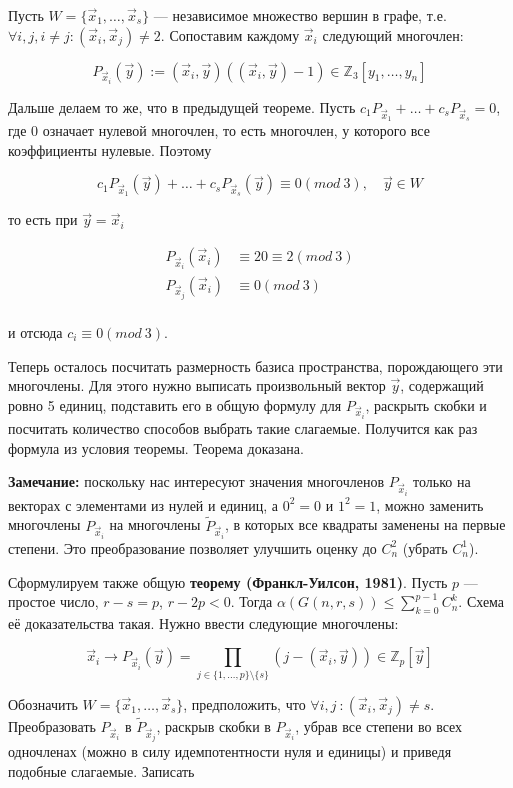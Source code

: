 \documentclass[12pt]{article}
\begin{document}
Пусть $W = \{ \vec x_1 , \ldots, \vec x_s \}$ — независимое множество вершин в графе, т.е. $\forall i, j, i \neq j \colon (\vec x_i, \vec x_j) \neq 2$. Сопоставим каждому $\vec x_i$ следующий многочлен:

\[
P_{\vec x_i}(\vec y) := (\vec x_i, \vec y) ((\vec x_i, \vec y) - 1) \in \mathbb{Z}_3 [y_1, \ldots, y_n]
\]

Дальше делаем то же, что в предыдущей теореме. Пусть $c_1 P_{\vec x_1} + \ldots + c_s P_{\vec x_s} = 0$, где $0$ означает нулевой многочлен, то есть многочлен, у которого все коэффициенты нулевые. Поэтому

\[
c_1 P_{\vec x_1}(\vec y) + \ldots + c_s P_{\vec x_s}(\vec y) \equiv 0 (mod\ 3), \quad \vec y \in W
\]

то есть при $\vec y = \vec x_i$

\begin{align*}
P_{\vec x_i}(\vec x_i) &\equiv 20 \equiv 2 (mod\ 3) \\
P_{\vec x_j}(\vec x_i) &\equiv 0 (mod\ 3) \\
\end{align*}

и отсюда $c_i \equiv 0 (mod\ 3)$.

Теперь осталось посчитать размерность базиса пространства, порождающего эти многочлены. Для этого нужно выписать произвольный вектор $\vec y$, содержащий ровно 5 единиц, подставить его в общую формулу для $P_{\vec x_i}$, раскрыть скобки и посчитать количество способов выбрать такие слагаемые. Получится как раз формула из условия теоремы. Теорема доказана.

\textbf{Замечание:} поскольку нас интересуют значения многочленов $P_{\vec x_i}$ только на векторах с элементами из нулей и единиц, а $0^2 = 0$ и $1^2 = 1$, можно заменить многочлены $P_{\vec x_i}$ на многочлены $\tilde{P}_{\vec x_i}$, в которых все квадраты заменены на первые степени. Это преобразование позволяет улучшить оценку до $C^2_n$ (убрать $C^1_n$).

Сформулируем также общую \textbf{теорему (Франкл-Уилсон, 1981)}. Пусть $p$ — простое число, $r - s = p$, $r - 2p < 0$. Тогда $\alpha(G(n, r, s)) \leq \sum_{k = 0}^{p - 1} C^k_n$. Схема её доказательства такая. Нужно ввести следующие многочлены:

\[
\vec x_i \to P_{\vec x_i}(\vec y) = \prod_{j \in \{ 1, \ldots, p \} \setminus \{ s \}} (j - (\vec x_i, \vec y)) \in \mathbb{Z}_p[\vec y]
\]

Обозначить $W = \{ \vec x_1, \ldots, \vec x_s \}$, предположить, что $\forall i, j\ \colon (\vec x_i, \vec x_j) \neq s$. Преобразовать $P_{\vec x_i}$ в $\tilde{P}_{\vec x_j}$, раскрыв скобки в $P_{\vec x_i}$, убрав все степени во всех одночленах (можно в силу идемпотентности нуля и единицы) и приведя подобные слагаемые. Записать
\end{document}
